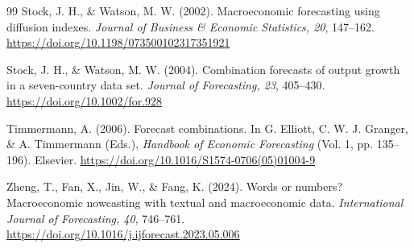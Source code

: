 \documentclass[preprint,12pt,authoryear]{elsarticle}
\begin{document}
\begin{thebibliography}{99}
Stock, J. H., \& Watson, M. W. (2002). Macroeconomic forecasting using
diffusion indexes. \emph{Journal of Business \& Economic Statistics, 20},
147--162. \url{https://doi.org/10.1198/073500102317351921}

Stock, J. H., \& Watson, M. W. (2004). Combination forecasts of output growth
in a seven-country data set. \emph{Journal of Forecasting, 23}, 405--430.
\url{https://doi.org/10.1002/for.928}

Timmermann, A. (2006). Forecast combinations. In G. Elliott,
C. W. J. Granger, \& A. Timmermann (Eds.), \emph{Handbook of Economic
Forecasting} (Vol. 1, pp. 135--196). Elsevier.
\url{https://doi.org/10.1016/S1574-0706(05)01004-9}

Zheng, T., Fan, X., Jin, W., \& Fang, K. (2024). Words or numbers?
Macroeconomic nowcasting with textual and macroeconomic data.
\emph{International Journal of Forecasting, 40}, 746--761.
\url{https://doi.org/10.1016/j.ijforecast.2023.05.006}

\end{thebibliography}
\endgroup
\end{document}
